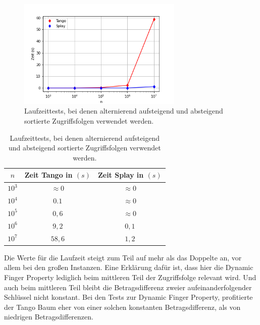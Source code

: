 \documentclass[a4paper,12pt]{article}
\begin{document}
\begin{figure}[H]
	\centering
	\includegraphics[width=0.7\textwidth]{Medien/laufzeittest/diagramm/sorted3}
	\caption{Laufzeittests, bei denen alternierend aufsteigend und absteigend sortierte Zugriffsfolgen verwendet werden.}
\end{figure}
\begin{table}[H]
	\begin{center}
		\begin{tabular}[c]{|c|c|c|}
			\hline
		$n$ & Zeit Tango in $\left(s\right)$ &Zeit Splay in $\left(s\right)$ \\
		\hline 
		$10^3$ & $\approx 0$ &$\approx 0$ \\
		\hline
		$10^4$  & $0.1$ &$\approx 0$  \\
		\hline
		$10^5$  & $0,6$ &$\approx 0$  \\
		\hline
		$10^6$  & $9,2$ &$0,1$  \\
		\hline
		$10^7$  & $58,6$ &$1,2$  \\
		\hline
		\end{tabular}
		\caption{Laufzeittests, bei denen alternierend aufsteigend und absteigend sortierte Zugriffsfolgen verwendet werden.} 
	\end{center} 
\end{table}
  
\noindent Die  Werte für die Laufzeit steigt zum Teil auf mehr als das Doppelte an, vor allem bei den großen Instanzen. Eine Erklärung dafür ist, dass hier die Dynamic Finger Property lediglich beim mittleren Teil der Zugriffsfolge relevant wird. Und auch beim mittleren Teil bleibt die Betragsdifferenz zweier aufeinanderfolgender Schlüssel nicht konstant. Bei den Tests zur Dynamic Finger Property, profitierte der Tango Baum eher von einer solchen konstanten Betragsdifferenz, als von niedrigen Betragsdifferenzen.

  

\end{document}
